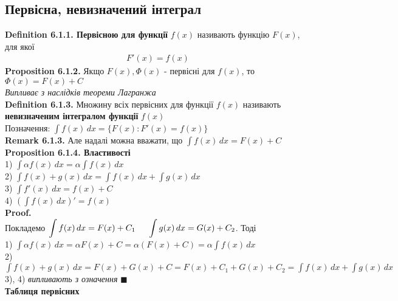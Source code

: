 \documentclass[a4paper, 14pt]{extarticle}
\def\huge{\displaystyle}
\def\bigline{\vspace{5mm}\\}
\def\defin#1{\textbf{Definition {#1}}}
\def\rm#1{\textbf{Remark {#1}}}
\def\prp#1{\textbf{Proposition {#1}}}
\def\proof{\textbf{Proof.}\\}
\def\bigline{\vspace{5mm}\\}
\def\qed{$\blacksquare$}
\begin{document}
\subsection{Первісна, невизначений інтеграл}
\defin{6.1.1. Первісною для функції} $f(x)$ називають функцію $F(x)$, для якої
\begin{align*}
F'(x) = f(x)
\end{align*}
\prp{6.1.2.} Якщо $F(x), \Phi(x)$ - первісні для $f(x)$, то \\ $\Phi(x) = F(x) + C$\\
\textit{Випливає з наслідків теореми Лагранжа}
\bigline
\defin{6.1.3.} Множину всіх первісних для функції $f(x)$ називають \textbf{невизначеним інтегралом функції} $f(x)$\\
Позначення: $\huge \int f(x) \,dx = \{F(x): F'(x) = f(x)\}$
\bigline
\rm{6.1.3.} Але надалі можна вважати, що
$\huge \int f(x) \,dx = F(x) + C$
\bigline
\prp{6.1.4. Властивості}\\
1) $\huge \int \alpha f(x)\,dx = \alpha \int f(x)\,dx$\\
2) $\huge \int f(x) + g(x) \,dx = \int f(x)\,dx + \int g(x)\,dx$\\
3) $\huge \int f'(x)\,dx = f(x) + C$\\
4) $\huge \left(\int f(x)\,dx \right)' = f(x)$\\
\proof
Покладемо $\huge \int f(x)\,dx = F(x) + C_1 \hspace{0.5cm} \int g(x)\,dx = G(x) + C_2$. Тоді\\
1) $\huge \int \alpha f(x)\,dx = \alpha F(x) + C = \alpha (F(x) + C) = \alpha \int f(x)\,dx$
\bigline
2) $\huge \int f(x) + g(x) \,dx = F(x) + G(x) + C = F(x) + C_1 + G(x) + C_2 = \int f(x)\,dx + \int g(x)\,dx$
\bigline
3), 4) \textit{випливають з означення} \qed
\bigline
\textbf{Таблиця первісних}
\end{document}
